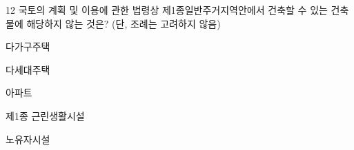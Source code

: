 \begin{question}{12}
국토의 계획 및 이용에 관한 법령상 제1종일반주거지역안에서 건축할 수 있는 건축물에 해당하지 않는 것은? (단, 조례는 고려하지 않음)
\begin{choices}
  \item 다가구주택
  \item 다세대주택
  \item 아파트
  \item 제1종 근린생활시설
  \item 노유자시설
\end{choices}
\end{question}
